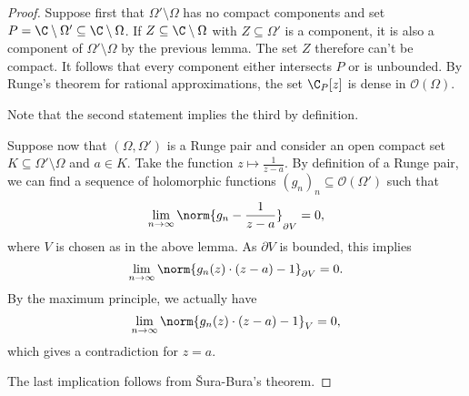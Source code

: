 \begin{proof}
Suppose first that $\Omega' \setminus \Omega$ has no compact
components and set
$P = \C \setminus \Omega' \subseteq \C \setminus \Omega$. If
$Z \subseteq \C \setminus \Omega$ with $Z \subseteq \Omega'$ is a
component, it is also a component of $\Omega' \setminus \Omega$ by
the previous lemma. The set $Z$ therefore can't be compact. It
follows that every component either intersects $P$ or is unbounded.
By Runge's theorem for rational approximations, the set $\C_P[z]$
is dense in $\mathcal{O}(\Omega)$.

Note that the second statement implies the third by definition.

Suppose now that $(\Omega, \Omega')$ is a Runge pair and consider
an open compact set $K \subseteq \Omega' \setminus \Omega$ and
$a \in K$. Take the function $z \mapsto \frac{1}{z-a}$. By
definition of a Runge pair, we can find a sequence of holomorphic
functions $(g_n)_n \subseteq \mathcal{O}(\Omega')$ such that
\[
\lim_{n \to \infty} \norm{g_n - \frac{1}{z-a}}_{\partial V} = 0,
\]
where $V$ is chosen as in the above lemma. As $\partial V$ is
bounded, this implies
\[
\lim_{n \to \infty} \norm{g_n(z) \cdot (z-a) - 1}_{\partial V} = 0.
\]
By the maximum principle, we actually have
\[
\lim_{n \to \infty} \norm{g_n(z) \cdot (z-a) - 1}_V = 0,
\]
which gives a contradiction for $z=a$.

The last implication follows from Šura-Bura's theorem.
\end{proof}
